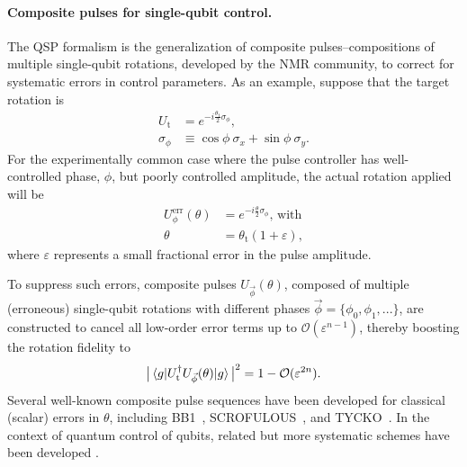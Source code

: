 \documentclass[aps,prx,showpacs,notitlepage,twocolumn,superscriptaddress,nofootinbib,preprintnumbers,floatfix,10pt, longbibliography]{revtex4-2}
\begin{document}
\paragraph{Composite pulses for single-qubit control.} The QSP formalism is the generalization of composite pulses--compositions of multiple single-qubit rotations, developed by the NMR community, to correct for systematic errors in control parameters. As an example, suppose that the target rotation is
\begin{align}
    U_\mathrm{t}&=e^{-i\frac{\theta_\mathrm{t}}{2}\sigma_\phi},\\
     \sigma_\phi&\equiv\cos{\phi} \ \sigma_x+\sin{\phi}\ \sigma_y.
\end{align}
For the experimentally common case where the pulse controller has well-controlled phase, $\phi$, but poorly controlled amplitude, the actual rotation applied will be  
\begin{align}
    U^\textrm{err}_\phi(\theta)&=e^{-i\frac{\theta}{2}\sigma_\phi},\,\textrm{with}\\
      \theta &=\theta_\mathrm{t}(1+\varepsilon),
\end{align}
where $\varepsilon$ represents a small fractional error in the pulse amplitude.

To suppress such errors, composite pulses $U_{\vec{\phi}}(\theta)$, composed of multiple (erroneous) single-qubit rotations with different phases $\vec{\phi}=\{\phi_0,\phi_1,...\}$, are constructed to cancel all low-order error terms up to $\mathcal{O}(\varepsilon^{n-1})$, thereby boosting the rotation fidelity to
\begin{align}
\big|\braket{g|U_\mathrm{t}^\dagger U_{\vec{\phi}}(\theta)|g}\big|^2 =1-\mathcal{O}(\varepsilon^{2n}).
\end{align}
Several well-known composite pulse sequences have been developed for classical (scalar) errors in $\theta$, including BB1~\cite{wimperis1994broadband}, SCROFULOUS~\cite{cummins2003tackling}, and TYCKO~\cite{tycko1985composite}.  In the context of quantum control of qubits, related but more systematic schemes have been developed \cite{ChuangRobust,ChuangRobustErratum,WhaleyRobust,martyn2021grand}.
\end{document}
